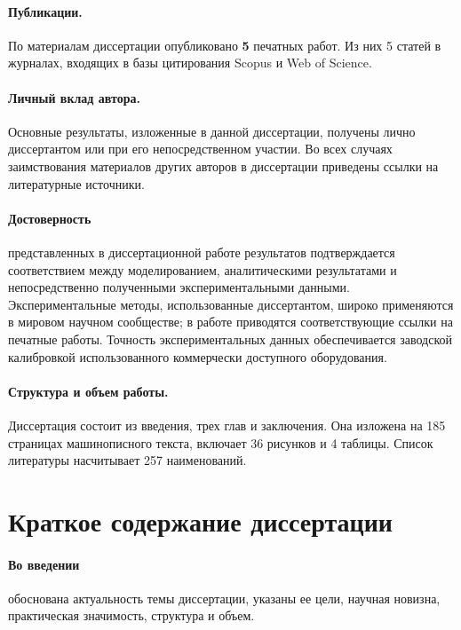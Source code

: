 \documentclass[14pt, a4paper]{extarticle}
\begin{document}
\paragraph{Публикации.} По материалам диссертации опубликовано \textbf{5} печатных работ. Из них 5 статей в журналах, входящих в базы цитирования Scopus и Web of Science. 

\paragraph{Личный вклад автора.} Основные результаты, изложенные в данной диссертации, получены лично диссертантом или при его непосредственном участии. Во всех случаях
заимствования материалов других авторов в диссертации приведены ссылки
на литературные источники.

\paragraph{Достоверность} представленных в диссертационной работе результатов подтверждается соответствием между моделированием, аналитическими результатами и непосредственно полученными экспериментальными данными. Экспериментальные методы, использованные диссертантом, широко применяются в мировом научном сообществе; в работе приводятся соответствующие ссылки на печатные работы. Точность экспериментальных данных обеспечивается заводской калибровкой использованного коммерчески доступного оборудования.

\paragraph{Структура и объем работы.} Диссертация состоит из введения, трех глав и заключения. Она изложена на 185 страницах машинописного текста, включает 36 рисунков и 4 таблицы. Список литературы насчитывает 257 наименований.

\section*{Краткое содержание диссертации}

\paragraph{Во введении} обоснована актуальность темы диссертации, указаны ее цели, научная новизна, практическая значимость, структура и объем.
\end{document}
